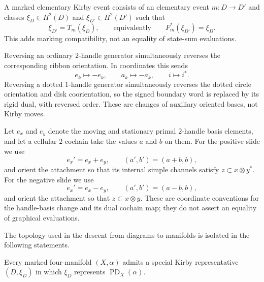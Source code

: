 \begin{definition}
\label{def:marked-kirby-event}
A marked elementary Kirby event consists of an elementary event
$m\colon D\to D'$ and classes $\xi_D\in H^2(D)$ and
$\xi_{D'}\in H^2(D')$ such that
\[
  \xi_{D'}=T_m(\xi_D),
  \qquad\text{equivalently}\qquad
  F_m^*(\xi_{D'})=\xi_D.
\]
This adds marking compatibility, not an equality of state-sum evaluations.
\end{definition}

\begin{convention}
\label{conv:orientation-reversal}
Reversing an ordinary $2$-handle generator simultaneously reverses the
corresponding ribbon orientation.  In coordinates this sends
\[
  e_k\longmapsto-e_k,\qquad a_k\longmapsto-a_k,
  \qquad i\longmapsto i^*.
\]
Reversing a dotted $1$-handle generator simultaneously reverses the dotted
circle orientation and disk coorientation, so the signed boundary word is
replaced by its rigid dual, with reversed order.  These are changes of
auxiliary oriented bases, not Kirby moves.
\end{convention}

\begin{convention}
\label{conv:two-two-coordinates}
Let $e_x$ and $e_y$ denote the moving and stationary primal $2$-handle
basis elements, and let a cellular $2$-cochain take the values $a$ and $b$
on them.  For the positive slide we use
\[
  e_x'=e_x+e_y,
  \qquad (a',b')=(a+b,b),
\]
and orient the attachment so that its internal simple channels satisfy
$z\subset x\otimes y^*$.  For the negative slide we use
\[
  e_x'=e_x-e_y,
  \qquad (a',b')=(a-b,b),
\]
and orient the attachment so that $z\subset x\otimes y$.  These are
coordinate conventions for the handle-basis change and its dual cochain
map; they do not assert an equality of graphical evaluations.
\end{convention}

The topology used in the descent from diagrams to manifolds is isolated in
the following statements.

\begin{proposition}
\label{prop:special-representative-existence}
Every marked four-manifold $(X,\alpha)$ admits a special Kirby representative
$(D,\xi_D)$ in which $\xi_D$ represents
$\operatorname{PD}_X(\alpha)$.
\end{proposition}

